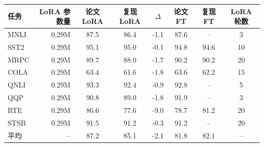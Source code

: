 \begin{tabular}{l r c c c c c c}
\toprule
任务 & LoRA 参数量 & 论文 LoRA & 复现 LoRA & $\Delta$ & 论文 FT & 复现 FT & LoRA 轮数 \\
\midrule
MNLI & 0.29M & 87.5 & 86.4 & -1.1 & 87.6 & -- & 3 \\
SST2 & 0.29M & 95.1 & 95.0 & -0.1 & 94.8 & 94.6 & 10 \\
MRPC & 0.29M & 89.7 & 88.0 & -1.7 & 90.2 & 90.2 & 20 \\
COLA & 0.29M & 63.4 & 61.6 & -1.8 & 63.6 & 62.2 & 15 \\
QNLI & 0.29M & 93.3 & 92.4 & -0.9 & 92.8 & -- & 5 \\
QQP & 0.29M & 90.8 & 89.0 & -1.8 & 91.9 & -- & 3 \\
RTE & 0.29M & 86.6 & 77.6 & -9.0 & 78.7 & 81.2 & 20 \\
STSB & 0.29M & 91.5 & 91.2 & -0.3 & 91.2 & -- & 20 \\
\midrule
平均 & -- & 87.2 & 85.1 & -2.1 & 81.8 & 82.1 & -- \\
\bottomrule
\end{tabular}